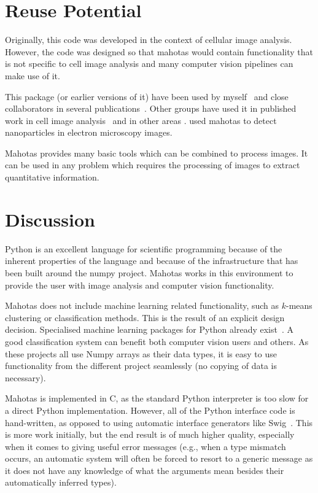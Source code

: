 \documentclass{scrartcl}
\newcommand*{\cpp}{{C\nolinebreak[4]\hspace{-.05em}\raisebox{.4ex}{\tiny\textbf{++}}}}
\begin{document}
\section{Reuse Potential}

Originally, this code was developed in the context of cellular image analysis.
However, the code was designed so that mahotas would contain functionality that
is not specific to cell image analysis and many computer vision pipelines can
make use of it.

This package (or earlier versions of it) have been used by
myself~\citep{Coelho2009,Coelho2010a} and close collaborators in several
publications~\citep{omerosearcher}. Other groups have used it in published
work in cell image analysis~\citep{CYTO:CYTO22034} and in other areas
\citep{springerlink:10.1007/978-3-642-32335-5_2}. \citet{ADFM:ADFM201300091}
used mahotas to detect nanoparticles in electron microscopy images.

Mahotas provides many basic tools which can be combined to process images. It
can be used in any problem which requires the processing of images to extract
quantitative information.

\section{Discussion}

Python is an excellent language for scientific programming because of the
inherent properties of the language and because of the infrastructure that has
been built around the numpy project. Mahotas works in this environment to
provide the user with image analysis and computer vision functionality.

Mahotas does not include machine learning related functionality, such as
$k$-means clustering or classification methods. This is the result of an
explicit design decision. Specialised machine learning packages for Python
already
exist~\citep{Pedregosa:2011:SML:2078183.2078195,springerlink:10.1007/978-3-540-30116-5_58,Schaul:2010:PYB:1756006.1756030,Sonnenburg:2010:SML:1756006.1859911}.
A good classification system can benefit both computer vision users
and others. As these projects all use Numpy arrays as their data types, it is
easy to use functionality from the different project seamlessly (no copying of
data is necessary).

Mahotas is implemented in \cpp{}, as the standard Python interpreter is too
slow for a direct Python implementation. However, all of the Python interface
code is hand-written, as opposed to using automatic interface generators like
Swig~\citep{Beazley2003599}. This is more work initially, but the end result is
of much higher quality, especially when it comes to giving useful error
messages (e.g., when a type mismatch occurs, an automatic system will often be
forced to resort to a generic message as it does not have any knowledge of what
the arguments mean besides their automatically inferred types).
\end{document}
